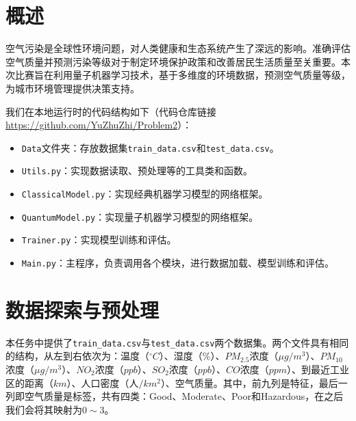 \documentclass[10pt,a4paper,twoside]{article}
\numberwithin{figure}{section}%
\numberwithin{table}{section}%
\begin{document}

\setlength{\abovedisplayskip}{2pt}%
\setlength{\belowdisplayskip}{2pt}%


\section{概述}

空气污染是全球性环境问题，对人类健康和生态系统产生了深远的影响。准确评估空气质量并预测污染等级对于制定环境保护政策和改善居民生活质量至关重要。本次比赛旨在利用量子机器学习技术，基于多维度的环境数据，预测空气质量等级，为城市环境管理提供决策支持。

我们在本地运行时的代码结构如下（代码仓库链接\hyperlink{https://github.com/YuZhuZhi/Problem2}{https://github.com/YuZhuZhi/Problem2}）：

\begin{itemize}
	\item \texttt{Data}文件夹：存放数据集\texttt{train\_data.csv}和\texttt{test\_data.csv}。
	\item \texttt{Utils.py}：实现数据读取、预处理等的工具类和函数。
	\item \texttt{ClassicalModel.py}：实现经典机器学习模型的网络框架。
	\item \texttt{QuantumModel.py}：实现量子机器学习模型的网络框架。
	\item \texttt{Trainer.py}：实现模型训练和评估。
	\item \texttt{Main.py}：主程序，负责调用各个模块，进行数据加载、模型训练和评估。
\end{itemize}


\section{数据探索与预处理}

本任务中提供了\texttt{train\_data.csv}与\texttt{test\_data.csv}两个数据集。两个文件具有相同的结构，从左到右依次为：温度（${}^\circ C$）、湿度（\%）、$PM_{2.5}$浓度（$\mu g/m^3$）、$PM_{10}$浓度（$\mu g/m^3$）、$NO_2$浓度（$ppb$）、$SO_2$浓度（$ppb$）、$CO$浓度（$ppm$）、到最近工业区的距离（$km$）、人口密度（人$/$$km^2$）、空气质量。其中，前九列是特征，最后一列即空气质量是标签，共有四类：Good、Moderate、Poor和Hazardous，在之后我们会将其映射为$0\sim3$。
\end{document}
